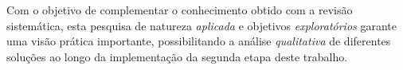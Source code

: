 	Com o objetivo de complementar o conhecimento obtido com a revisão sistemática, esta pesquisa de natureza \textit{aplicada} e objetivos \textit{exploratórios} garante uma visão prática importante, possibilitando a análise \textit{qualitativa} de diferentes soluções ao longo da implementação da segunda etapa deste trabalho.


